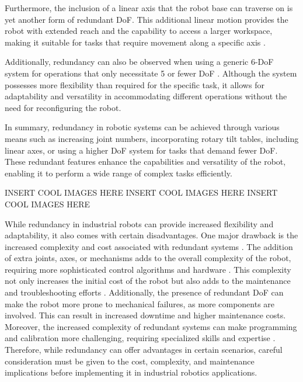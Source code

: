 Furthermore, the inclusion of a linear axis that the robot base can traverse on is yet another form of redundant DoF. This additional linear motion provides the robot with extended reach and the capability to access a larger workspace, making it suitable for tasks that require movement along a specific axis \cite{Boscariol.2019}.

Additionally, redundancy can also be observed when using a generic 6-DoF system for operations that only necessitate 5 or fewer DoF \cite{Hanafusa.1981,Liu.2022}. Although the system possesses more flexibility than required for the specific task, it allows for adaptability and versatility in accommodating different operations without the need for reconfiguring the robot.

In summary, redundancy in robotic systems can be achieved through various means such as increasing joint numbers, incorporating rotary tilt tables, including linear axes, or using a higher DoF system for tasks that demand fewer DoF. These redundant features enhance the capabilities and versatility of the robot, enabling it to perform a wide range of complex tasks efficiently.



INSERT COOL IMAGES HERE\newline
INSERT COOL IMAGES HERE\newline
INSERT COOL IMAGES HERE\newline



While redundancy in industrial robots can provide increased flexibility and adaptability, it also comes with certain disadvantages. One major drawback is the increased complexity and cost associated with redundant systems \cite{Halevi.2011}. The addition of extra joints, axes, or mechanisms adds to the overall complexity of the robot, requiring more sophisticated control algorithms and hardware \cite{Duong.2021}. This complexity not only increases the initial cost of the robot but also adds to the maintenance and troubleshooting efforts \cite{Ahangar.2019}. Additionally, the presence of redundant DoF can make the robot more prone to mechanical failures, as more components are involved. This can result in increased downtime and higher maintenance costs. Moreover, the increased complexity of redundant systems can make programming and calibration more challenging, requiring specialized skills and expertise \cite{Erdos.2016}. Therefore, while redundancy can offer advantages in certain scenarios, careful consideration must be given to the cost, complexity, and maintenance implications before implementing it in industrial robotics applications.




